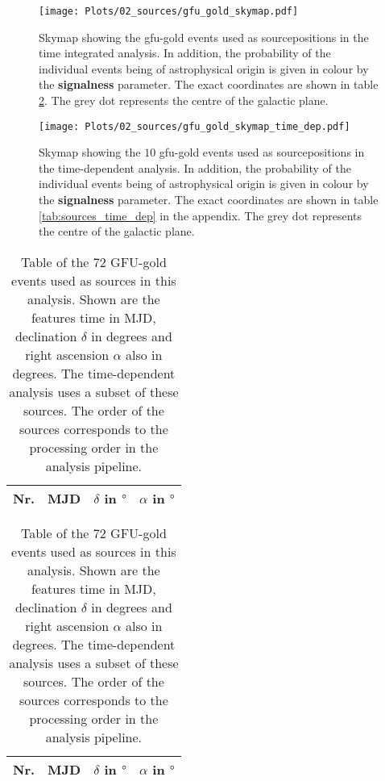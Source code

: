 \begin{figure}
    \centering
    \texttt{[image: Plots/02\_sources/gfu\_gold\_skymap.pdf]}
    \label{fig:skymap_1}
    \caption{Skymap showing the gfu-gold events used as sourcepositions in the time integrated analysis. In addition, the probability of the individual events being of astrophysical origin is given in colour by the \textbf{signalness} parameter. The exact coordinates are shown in table \ref{tab:sources}. The grey dot represents the centre of the galactic plane.}
\end{figure}

\begin{figure}
    \centering
    \texttt{[image: Plots/02\_sources/gfu\_gold\_skymap\_time\_dep.pdf]}
    \label{fig:skymap_2}
    \caption{Skymap showing the $\num{10}$ gfu-gold events used as sourcepositions in the time-dependent analysis. In addition, the probability of the individual events being of astrophysical origin is given in colour by the \textbf{signalness} parameter. The exact coordinates are shown in table \ref{tab:sources_time_dep} in the appendix. The grey dot represents the centre of the galactic plane.}
\end{figure}

\begin{table}[!htb]
  \caption{Table of the $\num{72}$ GFU-gold events used as sources in this analysis. Shown are the features time in MJD, declination $\delta$ in degrees and right ascension $\alpha$ also in degrees. The time-dependent analysis uses a subset of these sources. The order of the sources corresponds to the processing order in the analysis pipeline.}
  \label{tab:sources}
  \begin{subtable}{.5\linewidth}
  \centering
  \begin{tabular}{ccrr}
    \toprule
    Nr. & MJD &  $\delta$ in $\si{\degree}$ & $\alpha$ in $\si{\degree}$ \\
    \toprule
    
    \toprule
  \end{tabular}
\end{subtable}
\begin{subtable}{.5\linewidth}
\centering
  \begin{tabular}{ccrr}
    \toprule
    Nr. & MJD &  $\delta$ in $\si{\degree}$ & $\alpha$ in $\si{\degree}$ \\
    \toprule
    
    \toprule
  \end{tabular}
  \end{subtable}
\end{table}
